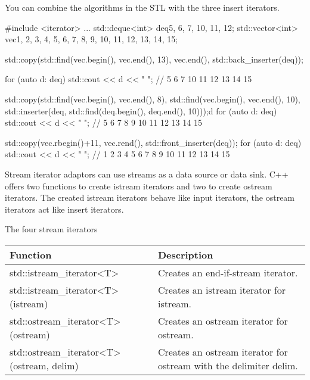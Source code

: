 You can combine the algorithms in the STL with the three insert iterators.

\begin{cpp}
#include <iterator>
...
std::deque<int> deq{5, 6, 7, 10, 11, 12};
std::vector<int> vec{1, 2, 3, 4, 5, 6, 7, 8, 9, 10, 11, 12, 13, 14, 15};

std::copy(std::find(vec.begin(), vec.end(), 13),
			vec.end(), std::back_inserter(deq));

for (auto d: deq) std::cout << d << " ";
	// 5 6 7 10 11 12 13 14 15

std::copy(std::find(vec.begin(), vec.end(), 8),
std::find(vec.begin(), vec.end(), 10),
std::inserter(deq,
std::find(deq.begin(), deq.end(), 10)));d
for (auto d: deq) std::cout << d << " ";
	// 5 6 7 8 9 10 11 12 13 14 15
	
std::copy(vec.rbegin()+11, vec.rend(),
std::front_inserter(deq));
for (auto d: deq) std::cout << d << " ";
		// 1 2 3 4 5 6 7 8 9 10 11 12 13 14 15
\end{cpp}



Stream iterator adaptors can use streams as a data source or data sink. C++ offers two functions to create istream iterators and two to create ostream iterators. The created istream iterators behave like input iterators, the ostream iterators act like insert iterators.

\begin{center}
The four stream iterators
\end{center}


\begin{longtable}[c]{|l|l|}
\hline
\textbf{Function}                                         & \textbf{Description}                     \\ \hline
\endfirsthead
%
\endhead
%
std::istream\_iterator\textless{}T\textgreater{}          & Creates an end-if-stream iterator.       \\ \hline
std::istream\_iterator\textless{}T\textgreater{}(istream) & Creates an istream iterator for istream. \\ \hline
std::ostream\_iterator\textless{}T\textgreater{}(ostream) & Creates an ostream iterator for ostream. \\ \hline
std::ostream\_iterator\textless{}T\textgreater{}(ostream, delim) & Creates an ostream iterator for ostream with the delimiter delim. \\ \hline
\end{longtable}


